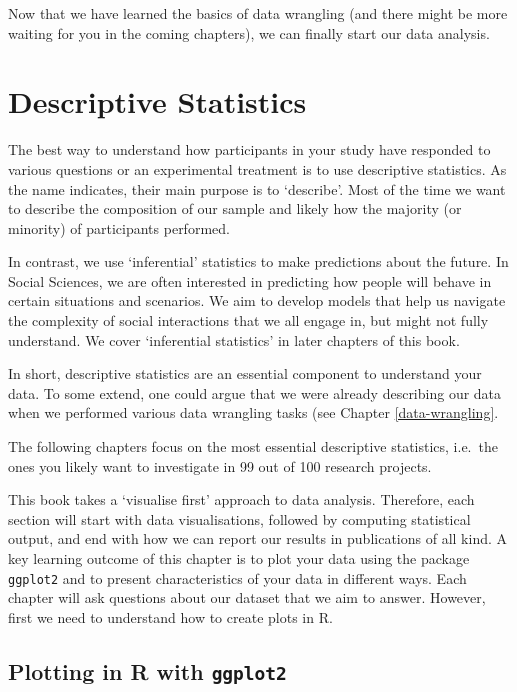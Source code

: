 \documentclass[
]{book}
\begin{document}
Now that we have learned the basics of data wrangling (and there might be more waiting for you in the coming chapters), we can finally start our data analysis.

\hypertarget{descriptive-statistics}{%
\chapter{Descriptive Statistics}\label{descriptive-statistics}}

The best way to understand how participants in your study have responded to various questions or an experimental treatment is to use descriptive statistics. As the name indicates, their main purpose is to `describe'. Most of the time we want to describe the composition of our sample and likely how the majority (or minority) of participants performed.

In contrast, we use `inferential' statistics to make predictions about the future. In Social Sciences, we are often interested in predicting how people will behave in certain situations and scenarios. We aim to develop models that help us navigate the complexity of social interactions that we all engage in, but might not fully understand. We cover `inferential statistics' in later chapters of this book.

In short, descriptive statistics are an essential component to understand your data. To some extend, one could argue that we were already describing our data when we performed various data wrangling tasks (see Chapter \ref{data-wrangling}.

The following chapters focus on the most essential descriptive statistics, i.e.~the ones you likely want to investigate in 99 out of 100 research projects.

This book takes a `visualise first' approach to data analysis. Therefore, each section will start with data visualisations, followed by computing statistical output, and end with how we can report our results in publications of all kind. A key learning outcome of this chapter is to plot your data using the package \texttt{ggplot2} and to present characteristics of your data in different ways. Each chapter will ask questions about our dataset that we aim to answer. However, first we need to understand how to create plots in R.

\hypertarget{plotting-in-r-with-ggplot2}{%
\section{\texorpdfstring{Plotting in R with \texttt{ggplot2}}{Plotting in R with ggplot2}}\label{plotting-in-r-with-ggplot2}}
\end{document}
